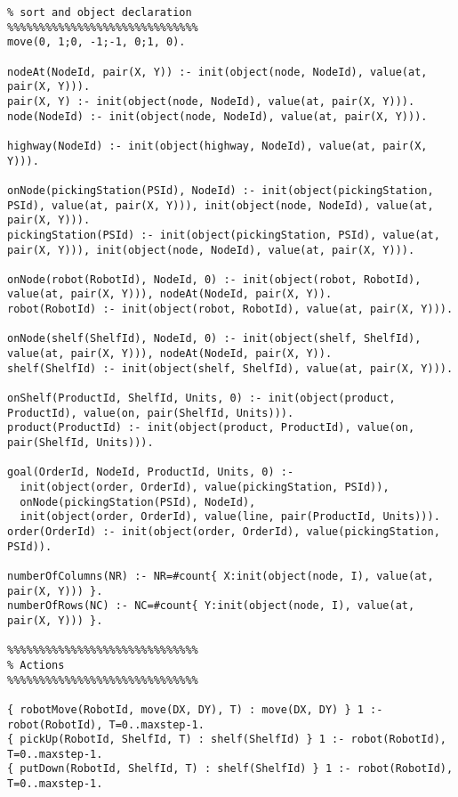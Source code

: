 \documentclass[letterpaper]{article} %
\begin{document}
 \begin{lstlisting}[numbers=none,language=clingo]
%%%%%%%%%%%%%%%%%%%%%%%%%%%%%%
% sort and object declaration
%%%%%%%%%%%%%%%%%%%%%%%%%%%%%%
move(0, 1;0, -1;-1, 0;1, 0).

nodeAt(NodeId, pair(X, Y)) :- init(object(node, NodeId), value(at, pair(X, Y))).
pair(X, Y) :- init(object(node, NodeId), value(at, pair(X, Y))).
node(NodeId) :- init(object(node, NodeId), value(at, pair(X, Y))).

highway(NodeId) :- init(object(highway, NodeId), value(at, pair(X, Y))).

onNode(pickingStation(PSId), NodeId) :- init(object(pickingStation, PSId), value(at, pair(X, Y))), init(object(node, NodeId), value(at, pair(X, Y))).
pickingStation(PSId) :- init(object(pickingStation, PSId), value(at, pair(X, Y))), init(object(node, NodeId), value(at, pair(X, Y))).

onNode(robot(RobotId), NodeId, 0) :- init(object(robot, RobotId), value(at, pair(X, Y))), nodeAt(NodeId, pair(X, Y)).
robot(RobotId) :- init(object(robot, RobotId), value(at, pair(X, Y))).

onNode(shelf(ShelfId), NodeId, 0) :- init(object(shelf, ShelfId), value(at, pair(X, Y))), nodeAt(NodeId, pair(X, Y)).
shelf(ShelfId) :- init(object(shelf, ShelfId), value(at, pair(X, Y))).

onShelf(ProductId, ShelfId, Units, 0) :- init(object(product, ProductId), value(on, pair(ShelfId, Units))).
product(ProductId) :- init(object(product, ProductId), value(on, pair(ShelfId, Units))).

goal(OrderId, NodeId, ProductId, Units, 0) :- 
  init(object(order, OrderId), value(pickingStation, PSId)),
  onNode(pickingStation(PSId), NodeId),
  init(object(order, OrderId), value(line, pair(ProductId, Units))).
order(OrderId) :- init(object(order, OrderId), value(pickingStation, PSId)).

numberOfColumns(NR) :- NR=#count{ X:init(object(node, I), value(at, pair(X, Y))) }.
numberOfRows(NC) :- NC=#count{ Y:init(object(node, I), value(at, pair(X, Y))) }.

%%%%%%%%%%%%%%%%%%%%%%%%%%%%%%
% Actions
%%%%%%%%%%%%%%%%%%%%%%%%%%%%%%

{ robotMove(RobotId, move(DX, DY), T) : move(DX, DY) } 1 :- robot(RobotId), T=0..maxstep-1.
{ pickUp(RobotId, ShelfId, T) : shelf(ShelfId) } 1 :- robot(RobotId), T=0..maxstep-1.
{ putDown(RobotId, ShelfId, T) : shelf(ShelfId) } 1 :- robot(RobotId), T=0..maxstep-1.


\end{lstlisting}
\end{document}
